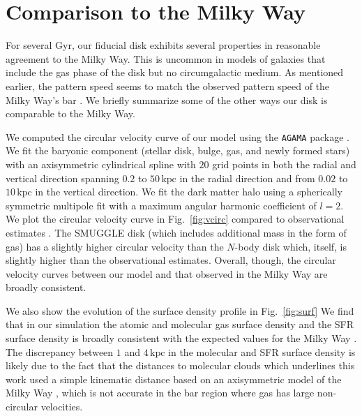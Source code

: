 \documentclass[twocolumn,linenumbers]{aastex631}
\newcommand{\Nbody}{$N$-body}
\newcommand{\SMUGGLE}{SMUGGLE}
\begin{document}
\section{Comparison to the Milky Way}
\label{app:milkyway}
For several Gyr, our fiducial disk exhibits several properties in reasonable
agreement to the Milky Way. This is uncommon in models of galaxies that include
the gas phase of the disk but no circumgalactic medium. As mentioned earlier,
the pattern speed seems to match the observed pattern speed of the Milky Way's
bar \citep{2019MNRAS.490.4740B}. We briefly summarize some of the other ways our
disk is comparable to the Milky Way.

We computed the circular velocity curve of our model using the \texttt{AGAMA}
package \citep{2019MNRAS.482.1525V}. We fit the baryonic component (stellar disk,
bulge, gas, and newly formed stars) with an axisymmetric cylindrical spline with
$20$ grid points in both the radial and vertical direction spanning $0.2$ to
$50\,\textrm{kpc}$ in the radial direction and from $0.02$ to $10\,\textrm{kpc}$
in the vertical direction. We fit the dark matter halo using a spherically
symmetric multipole fit with a maximum angular harmonic coefficient of $l=2$. We
plot the circular velocity curve in Fig.~\ref{fig:vcirc} compared to
observational estimates \citep{2019ApJ...871..120E}. The \SMUGGLE{} disk (which
includes additional mass in the form of gas) has a slightly higher circular
velocity than the \Nbody{} disk which, itself, is slightly higher than the
observational estimates. Overall, though, the circular velocity curves between
our model and that observed in the Milky Way are broadly consistent.

We also show the evolution of the surface density profile in Fig.~\ref{fig:surf}
We find that in our simulation the atomic and molecular gas surface density and
the SFR surface density is broadly consistent with the expected values for the
Milky Way \citep{2008AA...487..951K,2022ApJ...929L..18E}. The discrepancy between
$1$ and $4\,\textrm{kpc}$ in the molecular and SFR surface density is likely due
to the fact that the distances to molecular clouds which underlines this work
used a simple kinematic distance based on an axisymmetric model of the Milky
Way \citep{2017ApJ...834...57M}, which is not accurate in the bar region where gas
has large non-circular velocities.
\end{document}
